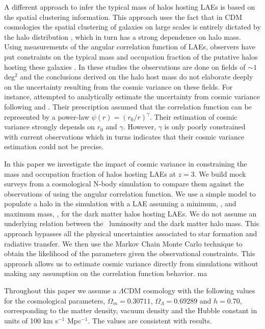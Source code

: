\documentclass{emulateapj}
\newcommand{\ly}{{\ifmmode{{\rm Ly}\alpha}\else{Ly$\alpha$}\fi}}
\newcommand{\mmin}{{\ifmmode{{M_{\rm min}}}\else{${M_{\rm min}}$}\fi}}
\newcommand{\mmax}{{\ifmmode{{M_{\rm max}}}\else{${M_{\rm max}}$}\fi}}
\begin{document}
A different approach to infer the typical mass of halos hosting
LAEs is based on the spatial clustering information. 
This approach uses the fact
that in CDM cosmologies the spatial clustering of galaxies on large
scales is entirely dictated by the halo distribution
\citep{Colberg00}, which in turn has a strong dependence on halo
mass. 
Using measurements of the angular correlation function of LAEs,
observers have put constraints on the typical mass and occupation
fraction of the putative halos hosting these galaxies
\citep{Hayashino2004,Gawiser07,Nilsson2007,Ouchi2010,Bielby16}. 
In these studies the observations are done on fields of $\sim 1$ deg$^{2}$ and
the conclusions derived on the halo host mass do not elaborate deeply on the
uncertainty resulting from the cosmic variance on these fields. 
For instance, \citet{Guaita2010} attempted to analytically 
estimate the uncertainty from cosmic variance 
following \citet{Somerville2004} and \citet{Peebles1980}. 
Their prescription assumed that the correlation function can be
represented by a power-law
$\psi\left(r\right)=\left(r_{0}/r\right)^{\gamma}$. 
Their estimation of cosmic variance strongly depends on $r_{0}$ and
$\gamma$.  
However, $\gamma$ is only poorly constrained with current
observations which in turns indicates that their cosmic variance
estimation could not be precise. 

In this paper we investigate the impact of cosmic variance in
constraining the mass and occupation fraction of halos hosting LAEs at $z=3$.
We build mock surveys from a cosmological N-body simulation to compare them
against the observations of \cite{Bielby16} using the angular
correlation function.  
We use a simple model to populate a halo in the simulation with a LAE   
assuming a minimum, \mmin, and maximum mass, \mmax, for the dark
matter halos hosting LAEs.  We do not  assume  an underlying relation 
between the \ly\  luminosity and the dark matter halo mass.  
This approach bypasses all the physical uncertainties associated to
star formation and radiative transfer. 
We then use the Markov Chain Monte Carlo technique to obtain the
likelihood of the parameters given the observational constraints.
This approach allows us to estimate cosmic variance directly from
simulations without making any assumption  on the correlation function
behavior. ma

Throughout this paper we assume a $\Lambda$CDM cosmology with the
following values for the cosmological parameters, $\Omega_{m}=0.30711$,
$\Omega_{\Lambda}=0.69289$ and $h=0.70$, corresponding to the matter
density, vacuum density and the Hubble constant in units of 100 km
s$^{-1}$ Mpc$^{-1}$.  The values are consistent with \citet{Planck2014} results.
\end{document}
